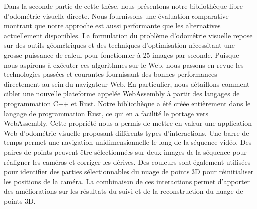 Dans la seconde partie de cette thèse,
nous présentons notre bibliothèque libre d'odométrie visuelle directe.
Nous fournissons une évaluation comparative montrant que notre approche
est aussi performante que les alternatives actuellement disponibles.
La formulation du problème d'odométrie visuelle
repose sur des outils géométriques et des techniques d'optimisation
nécessitant une grosse puissance de calcul pour fonctionner à 25 images par seconde.
Puisque nous aspirons à exécuter ces algorithmes sur le Web,
nous passons en revue les technologies passées et courantes
fournissant des bonnes performances directement au sein du navigateur Web.
En particulier, nous détaillons comment cibler une nouvelle plateforme appelée WebAssembly
à partir des langages de programmation C++ et Rust.
Notre bibliothèque a été créée entièrement dans le langage de programmation Rust,
ce qui en a facilité le portage vers WebAssembly.
Cette propriété nous a permis de mettre en valeur
une application Web d'odométrie visuelle proposant différents types d'interactions.
Une barre de temps permet une navigation unidimensionnelle le long de la séquence vidéo.
Des paires de points peuvent être sélectionnées sur deux images
de la séquence pour réaligner les caméras et corriger les dérives.
Des couleurs sont également utilisées pour identifier des parties sélectionnables
du nuage de points 3D pour réinitialiser les positions de la caméra.
La combinaison de ces interactions permet d'apporter des améliorations
sur les résultats du suivi et de la reconstruction du nuage de points 3D.
